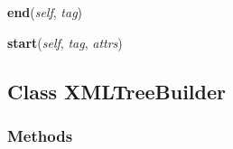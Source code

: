     \label{xml:etree:ElementTree:TreeBuilder:end}

    \vspace{0.5ex}

\hspace{.8\funcindent}\begin{boxedminipage}{\funcwidth}

    \raggedright \textbf{end}(\textit{self}, \textit{tag})

\setlength{\parskip}{2ex}
\setlength{\parskip}{1ex}
    \end{boxedminipage}

    \label{xml:etree:ElementTree:TreeBuilder:start}

    \vspace{0.5ex}

\hspace{.8\funcindent}\begin{boxedminipage}{\funcwidth}

    \raggedright \textbf{start}(\textit{self}, \textit{tag}, \textit{attrs})

\setlength{\parskip}{2ex}
\setlength{\parskip}{1ex}
    \end{boxedminipage}



\subsection{Class XMLTreeBuilder}

    \label{xml:etree:ElementTree:XMLTreeBuilder}


  \subsubsection{Methods}

